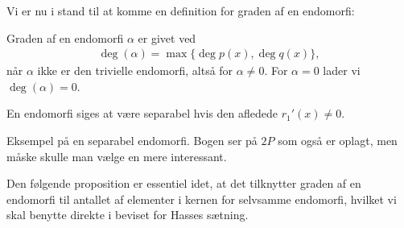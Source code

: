 Vi er nu i stand til at komme en definition for graden af en endomorfi:

\begin{definition}
Graden af en endomorfi $\alpha$ er givet ved
\begin{align*}
	\deg(\alpha) = \max \{ \deg p(x), \deg q(x) \},
\end{align*}
når $\alpha$ ikke er den trivielle endomorfi, altså for $\alpha \neq 0$. For $\alpha = 0$ lader vi $\deg (\alpha) = 0$.
\end{definition}

En endomorfi siges at være separabel hvis den afledede $r_1'(x) \neq 0$.

\begin{example}
Eksempel på en separabel endomorfi. Bogen ser på $2P$ som også er oplagt, men måske skulle man vælge en mere interessant.
\end{example}

Den følgende proposition er essentiel idet, at det tilknytter graden af en endomorfi til antallet af elementer i kernen for selvsamme endomorfi, hvilket vi skal benytte direkte i beviset for Hasses sætning.

